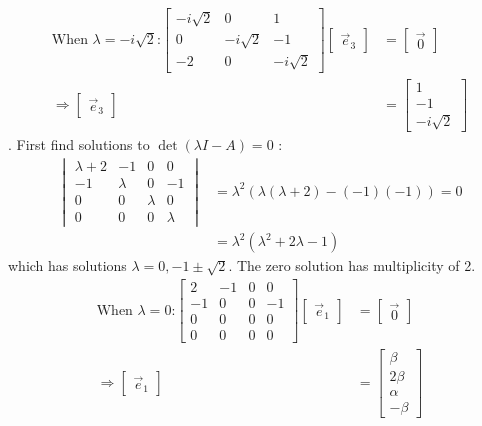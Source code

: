 \documentclass[11pt]{homework}
\begin{document}
\begin{align*}
\text{When $\lambda = -i\sqrt{2}$:}
  \begin{bmatrix}
  -i\sqrt{2} & 0 & 1 \\
  0 & -i\sqrt{2} & -1 \\
  -2 & 0 & -i\sqrt{2} 
  \end{bmatrix} 
  \begin{bmatrix}
  \vec e_3
  \end{bmatrix}
  &=
  \begin{bmatrix}
  \vec 0
  \end{bmatrix} \\
\Rightarrow
  \begin{bmatrix}
  \vec e_3
  \end{bmatrix}
  &=
  \begin{bmatrix}
  1 \\
  -1 \\
  -i\sqrt{2} 
  \end{bmatrix} 
\end{align*}
. First find solutions to $\det (\lambda I - A) = 0 $ :
\begin{align*}
  \begin{vmatrix}
  \lambda+2 & -1 & 0 & 0  \\
  -1 & \lambda & 0 & -1  \\
  0 & 0 & \lambda & 0  \\
  0 & 0 & 0 & \lambda 
  \end{vmatrix}
  &= \lambda^2 ( \lambda (\lambda +2) - (-1)(-1)) = 0\\
  &= \lambda^2 ( \lambda^2 + 2 \lambda -1)
\end{align*}
which has solutions $\lambda = 0, -1 \pm \sqrt{2}$.
The zero solution has multiplicity of 2.
\begin{align*}
\text{When $\lambda = 0$:}
  \begin{bmatrix}
  2 & -1 & 0 & 0  \\
  -1 & 0 & 0 & -1  \\
  0 & 0 & 0 & 0  \\
  0 & 0 & 0 & 0
  \end{bmatrix} 
  \begin{bmatrix}
  \vec e_1
  \end{bmatrix}
  &=
  \begin{bmatrix}
  \vec 0
  \end{bmatrix} \\
\Rightarrow
  \begin{bmatrix}
  \vec e_1
  \end{bmatrix}
  &=
  \begin{bmatrix}
  \beta \\
  2 \beta \\
  \alpha \\
  -\beta
  \end{bmatrix} 
\end{align*}
\end{document}
